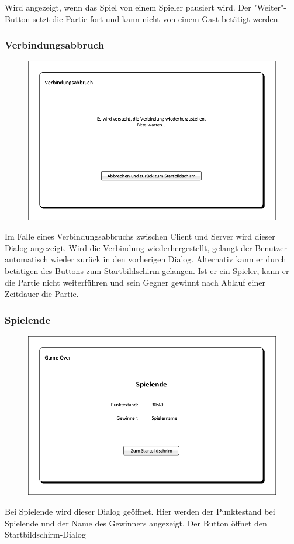 Wird angezeigt, wenn das Spiel von einem Spieler pausiert wird. Der "Weiter"-Button setzt die Partie fort und kann nicht von einem Gast betätigt werden.

\subsubsection{Verbindungsabbruch}
\begin{figure}[H]
	\centering
	\includegraphics[scale=0.8]{images/Verbindungsabbruch.pdf}
\end{figure}

Im Falle eines Verbindungsabbruchs zwischen Client und Server wird dieser Dialog angezeigt. Wird die Verbindung wiederhergestellt, gelangt der Benutzer automatisch wieder zurück in den vorherigen Dialog. Alternativ kann er durch betätigen des Buttons zum Startbildschirm gelangen. Ist er ein Spieler, kann er die Partie nicht weiterführen und sein Gegner gewinnt nach Ablauf einer Zeitdauer die Partie.

\subsubsection{Spielende}
\begin{figure}[H]
	\centering
	\includegraphics[scale=0.8]{images/Spielende.pdf}
\end{figure}

Bei Spielende wird dieser Dialog geöffnet. Hier werden der Punktestand bei Spielende und der Name des Gewinners angezeigt. Der Button öffnet den Startbildschirm-Dialog